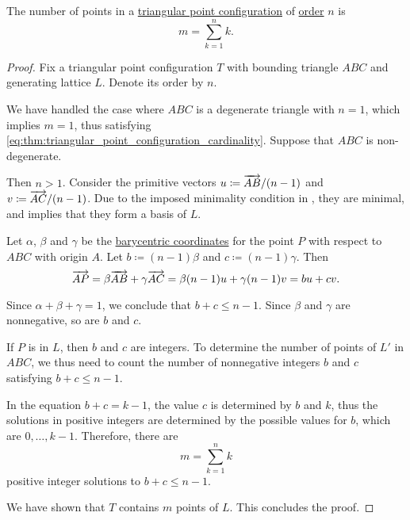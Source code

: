 \begin{proposition}\label{thm:triangular_point_configuration_cardinality}
  The number of points in a \hyperref[def:triangular_point_configuration]{triangular point configuration} of \hyperref[def:triangular_point_configuration_order]{order} \( n \) is
  \begin{equation}\label{eq:thm:triangular_point_configuration_cardinality}
    m = \sum_{k=1}^n k.
  \end{equation}
\end{proposition}
\begin{proof}
  Fix a triangular point configuration \( T \) with bounding triangle \( ABC \) and generating lattice \( L \). Denote its order by \( n \).

  We have handled the case where \( ABC \) is a degenerate triangle with \( n = 1 \), which implies \( m = 1 \), thus satisfying \eqref{eq:thm:triangular_point_configuration_cardinality}. Suppose that \( ABC \) is non-degenerate.

  Then \( n > 1 \). Consider the primitive vectors \( u \coloneqq \overrightarrow{AB} / (n - 1) \) and \( v \coloneqq \overrightarrow{AC} / (n - 1) \). Due to the imposed minimality condition in , they are minimal, and  implies that they form a basis of \( L \).

  Let \( \alpha \), \( \beta \) and \( \gamma \) be the \hyperref[def:barycentric_coordinate_system]{barycentric coordinates} for the point \( P \) with respect to \( ABC \) with origin \( A \). Let \( b \coloneqq (n - 1)\beta \) and \( c \coloneqq (n - 1)\gamma \). Then
  \begin{equation*}
    \overrightarrow{AP} = \beta \overrightarrow{AB} + \gamma \overrightarrow{AC} = \beta (n - 1) u + \gamma (n - 1) v = bu + cv.
  \end{equation*}

  Since \( \alpha + \beta + \gamma = 1 \), we conclude that \( b + c \leq n - 1 \). Since \( \beta \) and \( \gamma \) are nonnegative, so are \( b \) and \( c \).

  If \( P \) is in \( L \), then \( b \) and \( c \) are integers. To determine the number of points of \( L' \) in \( ABC \), we thus need to count the number of nonnegative integers \( b \) and \( c \) satisfying \( b + c \leq n - 1 \).

  In the equation \( b + c = k - 1 \), the value \( c \) is determined by \( b \) and \( k \), thus the solutions in positive integers are determined by the possible values for \( b \), which are \( 0, \ldots, k - 1 \). Therefore, there are
  \begin{equation*}
    m = \sum_{k=1}^n k
  \end{equation*}
  positive integer solutions to \( b + c \leq n - 1 \).

  We have shown that \( T \) contains \( m \) points of \( L \). This concludes the proof.
\end{proof}


